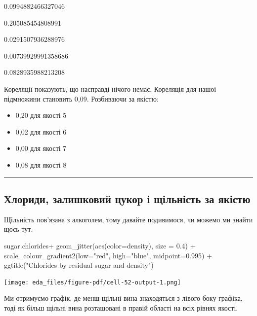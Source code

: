\documentclass[
  letterpaper,
  DIV=11,
  numbers=noendperiod]{scrreprt}
\newenvironment{Shaded}{\begin{snugshade}}{\end{snugshade}}
\newcommand{\AttributeTok}[1]{\textcolor[rgb]{0.40,0.45,0.13}{#1}}
\newcommand{\FloatTok}[1]{\textcolor[rgb]{0.68,0.00,0.00}{#1}}
\newcommand{\FunctionTok}[1]{\textcolor[rgb]{0.28,0.35,0.67}{#1}}
\newcommand{\NormalTok}[1]{\textcolor[rgb]{0.00,0.23,0.31}{#1}}
\newcommand{\SpecialCharTok}[1]{\textcolor[rgb]{0.37,0.37,0.37}{#1}}
\newcommand{\StringTok}[1]{\textcolor[rgb]{0.13,0.47,0.30}{#1}}
\providecommand{\tightlist}{%
  \setlength{\itemsep}{0pt}\setlength{\parskip}{0pt}}\usepackage{longtable,booktabs,array}
\begin{document}
0.0994882466327046

0.205085454808991

0.0291507936288976

0.00739929991358686

0.0828935988213208

Кореляції показують, що насправді нічого немає. Кореляція для нашої
підмножини становить 0,09. Розбиваючи за якістю:

\begin{itemize}
\tightlist
\item
  0,20 для якості 5
\item
  0,02 для якості 6
\item
  0,00 для якості 7
\item
  0,08 для якості 8
\end{itemize}

\begin{center}\rule{0.5\linewidth}{0.5pt}\end{center}

\subsection{Хлориди, залишковий цукор і щільність за
якістю}\label{ux445ux43bux43eux440ux438ux434ux438-ux437ux430ux43bux438ux448ux43aux43eux432ux438ux439-ux446ux443ux43aux43eux440-ux456-ux449ux456ux43bux44cux43dux456ux441ux442ux44c-ux437ux430-ux44fux43aux456ux441ux442ux44e-1}

Щільність пов'язана з алкоголем, тому давайте подивимося, чи можемо ми
знайти щось тут.

\begin{Shaded}
\begin{Highlighting}[]
\NormalTok{sugar.chlorides}\SpecialCharTok{+}
  \FunctionTok{geom\_jitter}\NormalTok{(}\FunctionTok{aes}\NormalTok{(}\AttributeTok{color=}\NormalTok{density), }\AttributeTok{size =} \FloatTok{0.4}\NormalTok{) }\SpecialCharTok{+}
  \FunctionTok{scale\_colour\_gradient2}\NormalTok{(}\AttributeTok{low=}\StringTok{"red"}\NormalTok{, }\AttributeTok{high=}\StringTok{"blue"}\NormalTok{, }\AttributeTok{midpoint=}\FloatTok{0.995}\NormalTok{) }\SpecialCharTok{+}
  \FunctionTok{ggtitle}\NormalTok{(}\StringTok{"Chlorides by residual sugar and density"}\NormalTok{)}
\end{Highlighting}
\end{Shaded}

\texttt{[image: eda\_files/figure-pdf/cell-52-output-1.png]}

Ми отримуємо графік, де менш щільні вина знаходяться з лівого боку
графіка, тоді як більш щільні вина розташовані в правій області на всіх
рівнях якості.
\end{document}
